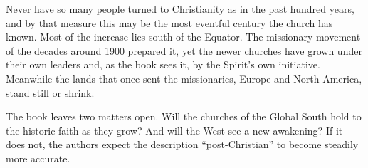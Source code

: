 \begin{partoverview}
Never have so many people turned to Christianity as in the past hundred years, and by that measure
this may be the most eventful century the church has known. Most of the increase lies south of the
Equator. The missionary movement of the decades around 1900 prepared it, yet the newer churches have
grown under their own leaders and, as the book sees it, by the Spirit's own initiative. Meanwhile the
lands that once sent the missionaries, Europe and North America, stand still or shrink.

The book leaves two matters open. Will the churches of the Global South hold to the historic faith as
they grow? And will the West see a new awakening? If it does not, the authors expect the description
``post-Christian'' to become steadily more accurate.
\end{partoverview}
